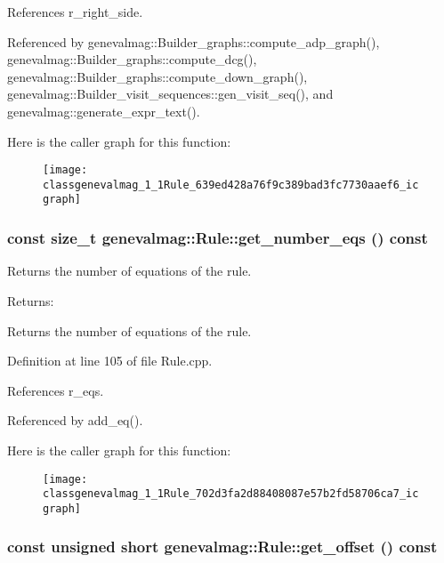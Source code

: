 References r\_\-right\_\-side.

Referenced by genevalmag::Builder\_\-graphs::compute\_\-adp\_\-graph(), genevalmag::Builder\_\-graphs::compute\_\-dcg(), genevalmag::Builder\_\-graphs::compute\_\-down\_\-graph(), genevalmag::Builder\_\-visit\_\-sequences::gen\_\-visit\_\-seq(), and genevalmag::generate\_\-expr\_\-text().

Here is the caller graph for this function:\nopagebreak
\begin{figure}[H]
\begin{center}
\leavevmode
\texttt{[image: classgenevalmag\_1\_1Rule\_639ed428a76f9c389bad3fc7730aaef6\_icgraph]}
\end{center}
\end{figure}
\hypertarget{classgenevalmag_1_1Rule_702d3fa2d88408087e57b2fd58706ca7}{
\subsubsection[{get\_\-number\_\-eqs}]{\setlength{\rightskip}{0pt plus 5cm}const size\_\-t genevalmag::Rule::get\_\-number\_\-eqs () const}}
\label{classgenevalmag_1_1Rule_702d3fa2d88408087e57b2fd58706ca7}


Returns the number of equations of the rule. \begin{Desc}
\item[Returns:]\end{Desc}
Returns the number of equations of the rule. 

Definition at line 105 of file Rule.cpp.

References r\_\-eqs.

Referenced by add\_\-eq().

Here is the caller graph for this function:\nopagebreak
\begin{figure}[H]
\begin{center}
\leavevmode
\texttt{[image: classgenevalmag\_1\_1Rule\_702d3fa2d88408087e57b2fd58706ca7\_icgraph]}
\end{center}
\end{figure}
\hypertarget{classgenevalmag_1_1Rule_e0c8764f699b6c41f46a9a0c6e010e6c}{
\subsubsection[{get\_\-offset}]{\setlength{\rightskip}{0pt plus 5cm}const unsigned short genevalmag::Rule::get\_\-offset () const}}
\label{classgenevalmag_1_1Rule_e0c8764f699b6c41f46a9a0c6e010e6c}


